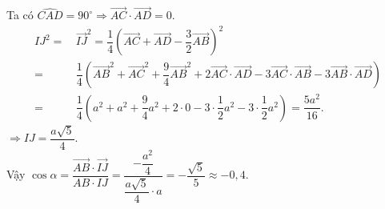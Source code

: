 \begin{ex}
{Ta có $\widehat{CAD}=90^\circ \Rightarrow \overrightarrow{AC}\cdot \overrightarrow{AD}=0$.
\begin{align*}
IJ^2=&\, {\overrightarrow{IJ}}^2=\dfrac{1}{4}\left(\overrightarrow{AC}+\overrightarrow{AD}-\dfrac{3}{2}\overrightarrow{AB} \right)^2 \\
=&\, \dfrac{1}{4}\left({\overrightarrow{AB}}^2+{\overrightarrow{AC}}^2+\dfrac{9}{4}{\overrightarrow{AB}}^2+2\overrightarrow{AC}\cdot \overrightarrow{AD}-3\overrightarrow{AC}\cdot \overrightarrow{AB}-3\overrightarrow{AB}\cdot \overrightarrow{AD} \right) \\
=&\, \dfrac{1}{4}\left(a^2+a^2+\dfrac{9}{4}a^2+2\cdot 0-3\cdot \dfrac{1}{2}a^2-3\cdot \dfrac{1}{2}a^2 \right)=\dfrac{5a^2}{16}.
\end{align*}
$\Rightarrow IJ=\dfrac{a\sqrt{5}}{4}$.\\
Vậy $\cos \alpha=\dfrac{\overrightarrow{AB}\cdot \overrightarrow{IJ}}{AB\cdot IJ}=\dfrac{-\dfrac{a^2}{4}}{\dfrac{a\sqrt{5}}{4}\cdot a}=-\dfrac{\sqrt{5}}{5}\approx -0{,}4$.
}
\end{ex}

